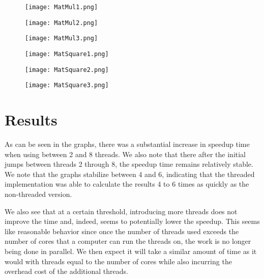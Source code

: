 \documentclass[11pt]{article} %
\begin{document}
\begin{figure}
\centering
\begin{minipage}{.5\textwidth}
  \centering
  \texttt{[image: MatMul1.png]}
  \label{fig:test1}
\end{minipage}%
\begin{minipage}{.5\textwidth}
  \centering
  \texttt{[image: MatMul2.png]}
  \label{fig:test2}
\end{minipage}
\end{figure}

\begin{figure}
\centering
\begin{minipage}{.5\textwidth}
  \centering
  \texttt{[image: MatMul3.png]}
  \label{fig:test3}
\end{minipage}%
\begin{minipage}{.5\textwidth}
  \centering
  \texttt{[image: MatSquare1.png]}
  \label{fig:test4}
\end{minipage}
\end{figure}

\begin{figure}
\centering
\begin{minipage}{.5\textwidth}
  \centering
  \texttt{[image: MatSquare2.png]}
  \label{fig:test5}
\end{minipage}%
\begin{minipage}{.5\textwidth}
  \centering
  \texttt{[image: MatSquare3.png]}
  \label{fig:test6}
\end{minipage}
\end{figure}

\newpage

\section*{Results}
As can be seen in the graphs, there was a substantial increase in speedup time when using between 2 and 8 threads. We also note that there after the initial jumps between threads 2 through 8, the speedup time remains relatively stable. We note that the graphs stabilize between 4 and 6, indicating that the threaded implementation was able to calculate the results 4 to 6 times as quickly as the non-threaded version.

We also see that at a certain threshold, introducing more threads does not improve the time and, indeed, seems to potentially lower the speedup. This seems like reasonable behavior since once the number of threads used exceeds the number of cores that a computer can run the threads on, the work is no longer being done in parallel. We then expect it will take a similar amount of time as it would with threads equal to the number of cores while also incurring the overhead cost of the additional threads.
\end{document}
